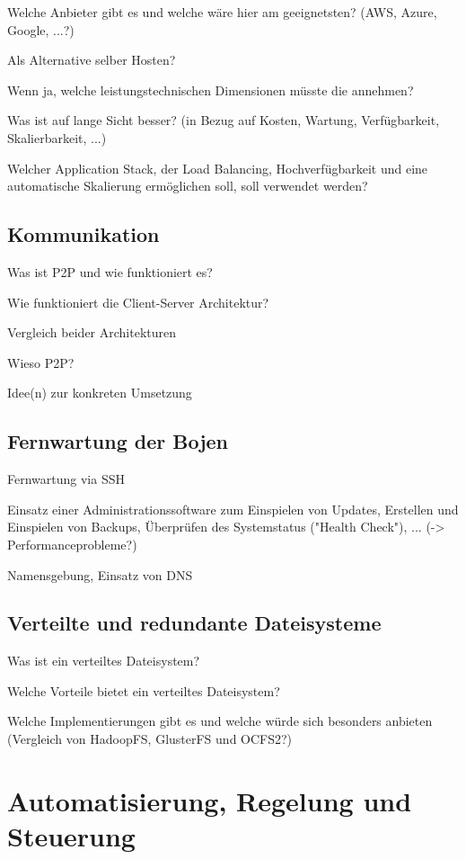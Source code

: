 Welche Anbieter gibt es und welche wäre hier am geeignetsten? (AWS, Azure, Google, ...?)


Als Alternative selber Hosten?

Wenn ja, welche leistungstechnischen Dimensionen müsste die annehmen?

Was ist auf lange Sicht besser?
(in Bezug auf Kosten, Wartung, Verfügbarkeit, Skalierbarkeit, ...)

Welcher Application Stack, der Load Balancing, Hochverfügbarkeit und eine automatische Skalierung ermöglichen soll, soll verwendet werden?

\subsection{Kommunikation}
\label{subsec:Kommunikation}
Was ist P2P und wie funktioniert es?

Wie funktioniert die Client-Server Architektur?

Vergleich beider Architekturen

Wieso P2P?

Idee(n) zur konkreten Umsetzung

\subsection{Fernwartung der Bojen}
\label{subsec:Fernwartung der Bojen}
Fernwartung via SSH

Einsatz einer Administrationssoftware zum Einspielen von Updates, Erstellen und Einspielen von Backups, Überprüfen des Systemstatus ("Health Check"), ...
(-> Performanceprobleme?)

Namensgebung, Einsatz von DNS

\subsection{Verteilte und redundante Dateisysteme}
\label{subsec:Verteilte und redundante Dateisysteme}
Was ist ein verteiltes Dateisystem?

Welche Vorteile bietet ein verteiltes Dateisystem?

Welche Implementierungen gibt es und welche würde sich besonders anbieten (Vergleich von HadoopFS, GlusterFS und OCFS2?)


\section{Automatisierung, Regelung und Steuerung}
\label{sec:Automatisierung, Regelung und Steuerung}
